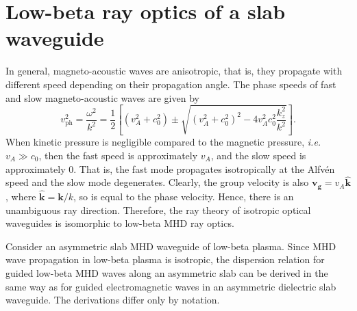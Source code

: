 	
	\section{Low-beta ray optics of a slab waveguide}
	\label{sec: low beta}
	
	In general, magneto-acoustic waves are anisotropic, that is, they propagate with different speed depending on their propagation angle. The phase speeds of fast and slow magneto-acoustic waves are given by
	\begin{equation}
	v_\mathrm{ph}^2 = \frac{\omega^2}{k^2} = \frac{1}{2}\left[ (v_A^2 + c_0^2) \pm \sqrt{(v_A^2 + c_0^2)^2 - 4v_A^2c_0^2\frac{k_z^2}{k^2}} \right]. \label{MHD DR}
	\end{equation}
	When kinetic pressure is negligible compared to the magnetic pressure, \textit{i.e.} $v_A \gg c_0$, then the fast speed is approximately $v_A$, and the slow speed is approximately $0$. That is, the fast mode propagates isotropically at the Alfv\'{e}n speed and the slow mode degenerates. Clearly, the group velocity is also $\mathbf{v_g} = v_A \mathbf{\hat{k}}$, where $\mathbf{\hat{k}} = \mathbf{k}/k$, so is equal to the phase velocity. Hence, there is an unambiguous ray direction. Therefore, the ray theory of isotropic optical waveguides is isomorphic to low-beta MHD ray optics.
	
	Consider an asymmetric slab MHD waveguide of low-beta plasma. Since MHD wave propagation in low-beta plasma is isotropic, the dispersion relation for guided low-beta MHD waves along an asymmetric slab can be derived in the same way as for guided electromagnetic waves in an asymmetric dielectric slab waveguide. The derivations differ only by notation.
	
